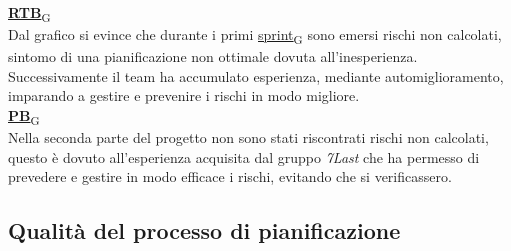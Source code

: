 \begin{flushleft}
\href{https://7last.github.io/docs/pb/documentazione-interna/glossario\#requirements-and-technology-baseline}{\textbf{RTB}\textsubscript{G}} \\
Dal grafico si evince che durante i primi \href{https://7last.github.io/docs/pb/documentazione-interna/glossario\#sprint}{sprint\textsubscript{G}} sono emersi rischi non calcolati, sintomo di una pianificazione non ottimale dovuta all'inesperienza. Successivamente il team ha accumulato esperienza, mediante automiglioramento, imparando a gestire e prevenire i rischi in modo migliore. \\
\href{https://7last.github.io/docs/pb/documentazione-interna/glossario\#product-baseline}{\textbf{PB}\textsubscript{G}} \\
Nella seconda parte del progetto non sono stati riscontrati rischi non calcolati, questo è dovuto all'esperienza acquisita dal gruppo \textit{7Last} che ha permesso di prevedere e gestire in modo efficace i rischi, evitando che si verificassero.
\end{flushleft}

\newpage
\subsection{Qualità del processo di pianificazione}
